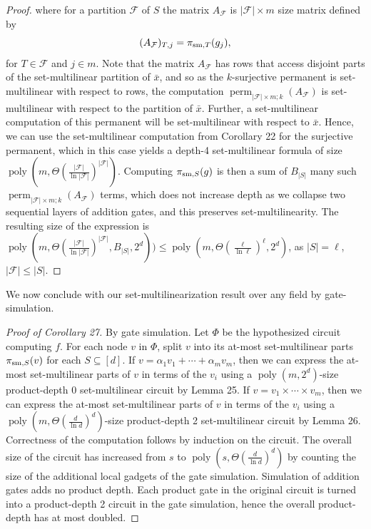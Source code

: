 \begin{proof}
where for a partition $\mathcal F$ of $S$ the matrix $A_{\mathcal F}$ is $|\mathcal F|\times m$ size matrix defined by
\[(A_{\mathcal F})_{T,j}=\pi_{{\rm sm},T}(g_j),\]
for $T\in\mathcal F$ and $j\in m$. Note that the matrix $A_{\mathcal F}$ has rows that access disjoint parts of the set-multilinear partition of $\bar x$, and so as the $k$-surjective permanent is set-multilinear with respect to rows, the computation $\operatorname{perm}_{|\mathcal F|\times m;k}(A_{\mathcal F})$ is set-multilinear with respect to the partition of $\bar x$. Further, a set-multilinear computation of this permanent will be set-multilinear with respect to $\bar x$. Hence, we can use the set-multilinear computation from Corollary 22 for the surjective permanent, which in this case yields a depth-4 set-multilinear formula of size $\operatorname{poly}(m,\Theta(\frac{|\mathcal F|}{\ln|\mathcal F|})^{|\mathcal F|})$.
Computing $\pi_{{\rm sm},S}(g)$ is then a sum of $B_{|S|}$ many such $\operatorname{perm}_{|\mathcal F|\times m;k}(A_{\mathcal F})$ terms, which does not increase depth as we collapse two sequential layers of addition gates, and this preserves set-multilinearity. The resulting size of the expression is $\operatorname{poly}(m,\Theta(\frac{|\mathcal F|}{\ln|\mathcal F|})^{|\mathcal F|},B_{|S|},2^d))\le\operatorname{poly}(m,\Theta(\frac\ell{\ln\ell})^\ell,2^d)$, as $|S|=\ell$, $|\mathcal F|\le|S|$.
\end{proof}
We now conclude with our set-multilinearization result over any field by gate-simulation.
\begin{proof}[Proof of Corollary 27]
By gate simulation. Let $\Phi$ be the hypothesized circuit computing $f$. For each node $v$ in $\Phi$, split $v$ into its at-most set-multilinear parts $\pi_{{\rm sm},S}(v)$ for each $S\subseteq[d]$.
If $v=\alpha_1v_1+\cdots+\alpha_m v_m$, then we can express the at-most set-multilinear parts of $v$ in terms of the $v_i$ using a $\operatorname{poly}(m,2^d)$-size product-depth 0 set-multilinear circuit by Lemma 25. If $v=v_1\times\cdots\times v_m$, then we can express the at-most set-multilinear parts of $v$ in terms of the $v_i$ using a $\operatorname{poly}(m,\Theta(\frac d{\ln d})^d)$-size product-depth 2 set-multilinear circuit by Lemma 26.
Correctness of the computation follows by induction on the circuit.
The overall size of the circuit has increased from $s$ to $\operatorname{poly}(s,\Theta(\frac d{\ln d})^d)$ by counting the size of the additional local gadgets of the gate simulation. Simulation of addition gates adds no product depth. Each product gate in the original circuit is turned into a product-depth 2 circuit in the gate simulation, hence the overall product-depth has at most doubled.
\end{proof}
